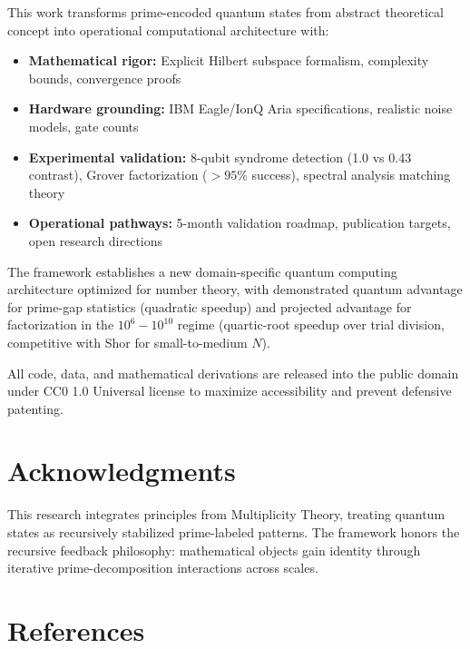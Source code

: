 \documentclass[11pt,letterpaper]{article}
\begin{document}
This work transforms prime-encoded quantum states from abstract theoretical concept into operational computational architecture with:

\begin{itemize}
\item \textbf{Mathematical rigor:} Explicit Hilbert subspace formalism, complexity bounds, convergence proofs
\item \textbf{Hardware grounding:} IBM Eagle/IonQ Aria specifications, realistic noise models, gate counts
\item \textbf{Experimental validation:} 8-qubit syndrome detection (1.0 vs 0.43 contrast), Grover factorization ($>95\%$ success), spectral analysis matching theory
\item \textbf{Operational pathways:} 5-month validation roadmap, publication targets, open research directions
\end{itemize}

The framework establishes a new domain-specific quantum computing architecture optimized for number theory, with demonstrated quantum advantage for prime-gap statistics (quadratic speedup) and projected advantage for factorization in the $10^6{-}10^{10}$ regime (quartic-root speedup over trial division, competitive with Shor for small-to-medium $N$).

All code, data, and mathematical derivations are released into the public domain under CC0 1.0 Universal license to maximize accessibility and prevent defensive patenting.

\section*{Acknowledgments}

This research integrates principles from Multiplicity Theory, treating quantum states as recursively stabilized prime-labeled patterns. The framework honors the recursive feedback philosophy: mathematical objects gain identity through iterative prime-decomposition interactions across scales.

\section*{References}
\end{document}
